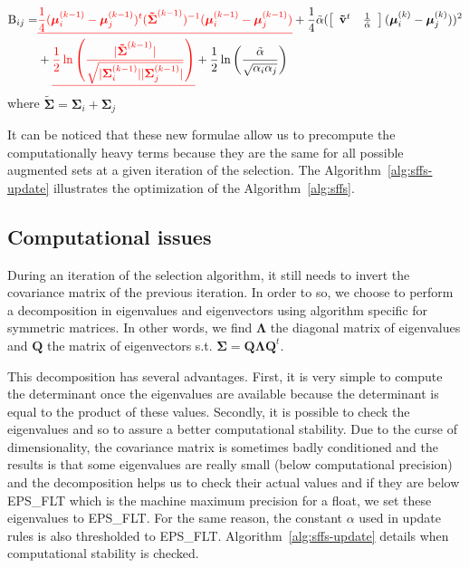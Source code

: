 \documentclass[a4paper,11pt,DIV=16,abstracton]{scrartcl}
\newcommand*{\equl}[2]{%
    \textcolor{#1}{\underline{#2}}%
}
\begin{document}
        \begin{align*}
            \text{B}_{ij} = &\equl{red}{\frac{1}{4} (\boldsymbol{\mu}_i^{(k-1)} - \boldsymbol{\mu}_j^{(k-1)})^t ( \boldsymbol{\tilde{\Sigma}}^{(k-1)} )^{-1} (\boldsymbol{\mu}_i^{(k-1)} - \boldsymbol{\mu}_j^{(k-1)})} + \frac{1}{4} \tilde{\alpha} ( \left[\begin{array}{cc} \mathbf{\tilde{v}}^t & \frac{1}{\tilde{\alpha}} \end{array}\right] (\boldsymbol{\mu}_{i}^{(k)} - \boldsymbol{\mu}_{j}^{(k)}) )^2\\
            &+ \equl{red}{\frac{1}{2} \ln \left( \frac{|\boldsymbol{\tilde{\Sigma}}^{(k-1)}|}{\sqrt{|\boldsymbol{\Sigma}_i^{(k-1)}| |\boldsymbol{\Sigma}_j^{(k-1)}|}} \right)} + \frac{1}{2} \ln \left( \frac{\tilde{\alpha}}{\sqrt{\alpha_i \alpha_j}} \right)
        \end{align*}
        where $\boldsymbol{\tilde{\Sigma}} = \boldsymbol{\Sigma}_i + \boldsymbol{\Sigma}_j$

        It can be noticed that these new formulae allow us to precompute the computationally heavy terms because they are the same for all possible augmented sets at a given iteration of the selection. The Algorithm~\ref{alg:sffs-update} illustrates the optimization of the Algorithm~\ref{alg:sffs}.

        \subsection{Computational issues}

        During an iteration of the selection algorithm, it still needs to invert the covariance matrix of the previous iteration. In order to so, we choose to perform a decomposition in eigenvalues and eigenvectors using algorithm specific for symmetric matrices. In other words, we find $\boldsymbol{\Lambda}$ the diagonal matrix of eigenvalues and $\mathbf{Q}$ the matrix of eigenvectors s.t. $\boldsymbol{\Sigma} = \mathbf{Q} \boldsymbol{\Lambda} \mathbf{Q}^t$.

        This decomposition has several advantages. First, it is very simple to compute the determinant once the eigenvalues are available because the determinant is equal to the product of these values. Secondly, it is possible to check the eigenvalues and so to assure a better computational stability. Due to the curse of dimensionality, the covariance matrix is sometimes badly conditioned and the results is that some eigenvalues are really small (below computational precision) and the decomposition helps us to check their actual values and if they are below EPS\_FLT which is the machine maximum precision for a float, we set these eigenvalues to EPS\_FLT. For the same reason, the constant $\alpha$ used in update rules is also thresholded to EPS\_FLT. Algorithm~\ref{alg:sffs-update} details when computational stability is checked.
\end{document}
